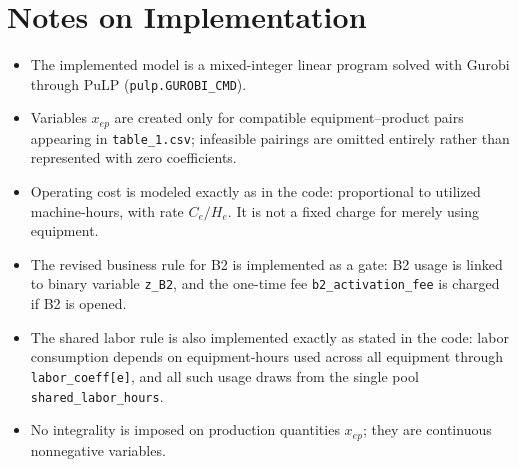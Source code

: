 \section*{Notes on Implementation}

\begin{itemize}
    \item The implemented model is a mixed-integer linear program solved with Gurobi through PuLP (\texttt{pulp.GUROBI\_CMD}).
    \item Variables $x_{ep}$ are created only for compatible equipment--product pairs appearing in \texttt{table\_1.csv}; infeasible pairings are omitted entirely rather than represented with zero coefficients.
    \item Operating cost is modeled exactly as in the code: proportional to utilized machine-hours, with rate $C_e/H_e$. It is not a fixed charge for merely using equipment.
    \item The revised business rule for B2 is implemented as a gate: B2 usage is linked to binary variable \texttt{z\_B2}, and the one-time fee \texttt{b2\_activation\_fee} is charged if B2 is opened.
    \item The shared labor rule is also implemented exactly as stated in the code: labor consumption depends on equipment-hours used across all equipment through \texttt{labor\_coeff[e]}, and all such usage draws from the single pool \texttt{shared\_labor\_hours}.
    \item No integrality is imposed on production quantities $x_{ep}$; they are continuous nonnegative variables.
\end{itemize}
